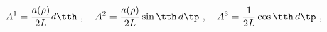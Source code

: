 \begin{equation}
\label{A}
  A^1 = \frac{a(\rho)}{2L}  d\tth~,\quad
  A^2 = \frac{a(\rho)}{2L}  \sin\tth \, d\tp~,\quad
  A^3 = \frac1{2L} \cos \tth \, d\tp~,
\end{equation}

